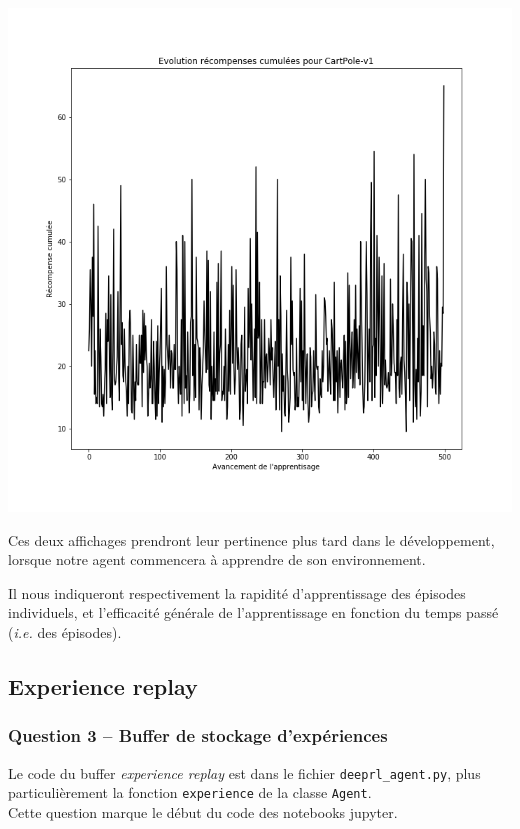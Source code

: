 \documentclass[12pt,french]{article}
\begin{document}
\begin{center}
    \includegraphics[width=\textwidth]{../src/img/env_CartPole-v1_random.png}
\end{center}

Ces deux affichages prendront leur pertinence plus tard dans le développement, lorsque notre agent commencera à apprendre de son environnement.

Il nous indiqueront respectivement la rapidité d'apprentissage des épisodes individuels, et l'efficacité générale de l'apprentissage en fonction du temps passé (\textit{i.e.} des épisodes).

\newpage
\subsection{Experience replay}

\subsubsection{Question 3 -- Buffer de stockage d'expériences}

Le code du buffer \textit{experience replay} est dans le fichier \texttt{deeprl\_agent.py}, plus particulièrement la fonction \texttt{experience} de la classe \texttt{Agent}.\\
Cette question marque le début du code des notebooks jupyter.
\end{document}
